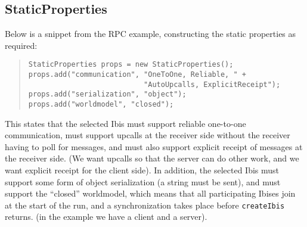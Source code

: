 \documentclass[10pt]{article}
\newcommand{\mysubsection}[1]{\subsection{#1}\label{#1}}
\begin{document}
\mysubsection{StaticProperties}

Below is a snippet from the RPC example, constructing the static
properties as required:
\begin{quote}
\begin{verbatim}
StaticProperties props = new StaticProperties();
props.add("communication", "OneToOne, Reliable, " + 
                           "AutoUpcalls, ExplicitReceipt");
props.add("serialization", "object");
props.add("worldmodel", "closed");
\end{verbatim}
\end{quote}
This states that the selected Ibis must support reliable one-to-one
communication, must support upcalls at the receiver side without the
receiver having to poll for messages, and must also support explicit
receipt of messages at the receiver side.
(We want upcalls so that the server can do other work, and we want
explicit receipt for the client side).
In addition, the selected Ibis must support some form of object
serialization (a string must be sent),
and must support the ``closed'' worldmodel, which means
that all participating Ibises join at the start of the run, and a
synchronization takes place before \verb+createIbis+ returns.
(in the example we have a client and a server).
\end{document}
